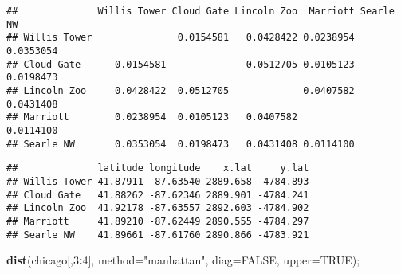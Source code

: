 \documentclass[
]{article}
\newenvironment{Shaded}{\begin{snugshade}}{\end{snugshade}}
\newcommand{\CommentTok}[1]{\textcolor[rgb]{0.56,0.35,0.01}{\textit{#1}}}
\newcommand{\DataTypeTok}[1]{\textcolor[rgb]{0.13,0.29,0.53}{#1}}
\newcommand{\DecValTok}[1]{\textcolor[rgb]{0.00,0.00,0.81}{#1}}
\newcommand{\FloatTok}[1]{\textcolor[rgb]{0.00,0.00,0.81}{#1}}
\newcommand{\KeywordTok}[1]{\textcolor[rgb]{0.13,0.29,0.53}{\textbf{#1}}}
\newcommand{\NormalTok}[1]{#1}
\newcommand{\OperatorTok}[1]{\textcolor[rgb]{0.81,0.36,0.00}{\textbf{#1}}}
\newcommand{\OtherTok}[1]{\textcolor[rgb]{0.56,0.35,0.01}{#1}}
\newcommand{\StringTok}[1]{\textcolor[rgb]{0.31,0.60,0.02}{#1}}
\begin{document}
\begin{verbatim}
##              Willis Tower Cloud Gate Lincoln Zoo  Marriott Searle NW
## Willis Tower               0.0154581   0.0428422 0.0238954 0.0353054
## Cloud Gate      0.0154581              0.0512705 0.0105123 0.0198473
## Lincoln Zoo     0.0428422  0.0512705             0.0407582 0.0431408
## Marriott        0.0238954  0.0105123   0.0407582           0.0114100
## Searle NW       0.0353054  0.0198473   0.0431408 0.0114100
\end{verbatim}

\begin{Shaded}
\end{Shaded}

\begin{verbatim}
##              latitude longitude    x.lat     y.lat
## Willis Tower 41.87911 -87.63540 2889.658 -4784.893
## Cloud Gate   41.88262 -87.62346 2889.901 -4784.241
## Lincoln Zoo  41.92178 -87.63557 2892.603 -4784.902
## Marriott     41.89210 -87.62449 2890.555 -4784.297
## Searle NW    41.89661 -87.61760 2890.866 -4783.921
\end{verbatim}

\begin{Shaded}
\begin{Highlighting}[]
\KeywordTok{dist}\NormalTok{(chicago[,}\DecValTok{3}\OperatorTok{:}\DecValTok{4}\NormalTok{], }\DataTypeTok{method=}\StringTok{"manhattan"}\NormalTok{, }\DataTypeTok{diag=}\OtherTok{FALSE}\NormalTok{, }\DataTypeTok{upper=}\OtherTok{TRUE}\NormalTok{);}
\end{Highlighting}
\end{Shaded}
\end{document}
